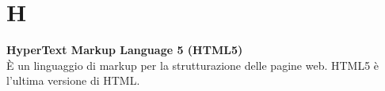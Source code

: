 \section{H}
\textbf{HyperText Markup Language 5 (HTML5)}\\
È un linguaggio di markup per la strutturazione delle pagine web. HTML5 è l’ultima versione di HTML. \\ \\
\clearpage